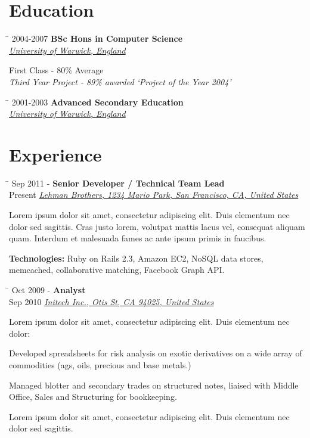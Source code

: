 \documentclass[10pt]{article} %
\newenvironment{itemize-noindent}
{\setlength{\leftmargini}{0em}\begin{itemize}}
{\end{itemize}}
\newlength{\smallertextwidth}
\newcommand{\education}[5]{
\begin{tabbing}
\hspace{2cm} \= \kill
{#1} \> \textbf{#2}\\
\>\+ \textit{\href{#4}{#3}}\\[3pt]
\begin{minipage}{\smallertextwidth}
\vspace{2mm}
#5
\end{minipage}
\end{tabbing}
\vspace{2mm}
}
\newcommand{\job}[6]{
\begin{tabbing}
\hspace{2cm} \= \kill
{#1} \> \textbf{#3}\\
{#2} \>\+ \textit{\href{#5}{#4}}\\[3pt]
\begin{minipage}{\smallertextwidth}
\vspace{2mm}
#6
\end{minipage}
\end{tabbing}
\vspace{2mm}
}
\begin{document}
\section{Education}

\education
{2004-2007}
{BSc Hons in Computer Science}
{University of Warwick, England}
{http://www.warwick.ac.uk}
{First Class - 80\% Average\\[5pt]
\textit{Third Year Project - 89\% awarded `Project of the Year 2004'}}

\education
{2001-2003}
{Advanced Secondary Education}
{University of Warwick, England}
{http://www.warwick.ac.uk}
{}


\section{Experience}

\job
{Sep 2011 -}{Present}
{Senior Developer / Technical Team Lead}
{Lehman Brothers, 1234 Mario Park, San Francisco, CA, United States}
{http://www.lehmanbrothers.com}
{Lorem ipsum dolor sit amet, consectetur adipiscing elit. Duis elementum nec dolor sed sagittis. Cras justo lorem, volutpat mattis lacus vel, consequat aliquam quam. Interdum et malesuada fames ac ante ipsum primis in faucibus.\\
\rule{0mm}{5mm}\textbf{Technologies:} Ruby on Rails 2.3, Amazon EC2, NoSQL data stores, memcached, collaborative matching, Facebook Graph API.}


\job
{Oct 2009 -}{Sep 2010}
{Analyst}
{Initech Inc., Otis St, CA 94025, United States}
{http://www.initech.com}
{Lorem ipsum dolor sit amet, consectetur adipiscing elit. Duis elementum nec dolor:

\begin{itemize-noindent}
\item{Developed spreadsheets for risk analysis on exotic derivatives on a wide array of commodities (ags, oils, precious and base metals.)}
\item{Managed blotter and secondary trades on structured notes, liaised with Middle Office, Sales and Structuring for bookkeeping.}
\end{itemize-noindent}

Lorem ipsum dolor sit amet, consectetur adipiscing elit. Duis elementum nec dolor sed sagittis.}
\end{document}
